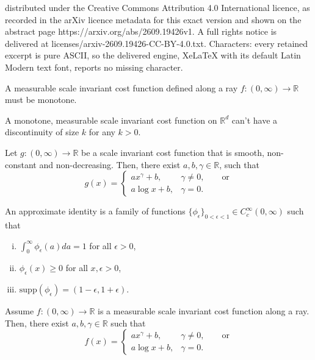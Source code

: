 \documentclass[10pt,a4paper]{amsart}
\newcommand{\R}{\mathbb{R}}
\begin{document}
distributed under the Creative Commons Attribution 4.0 International licence, as recorded in the arXiv licence metadata for this exact version and shown on the abstract page https://arxiv.org/abs/2609.19426v1. A full rights notice is delivered at licenses/arxiv-2609.19426-CC-BY-4.0.txt. Characters: every retained excerpt is pure ASCII, so the delivered engine, XeLaTeX with its default Latin Modern text font, reports no missing character.
\begin{proposition}[monotone]\label{thm:monotone}
  A measurable scale invariant cost function defined along a ray $f:(0,\infty)\rightarrow \mathbb{R}$ must be
  monotone.
\end{proposition}

\begin{proposition}\label{thm:continuous}
  A monotone, measurable scale invariant cost function on
  $\mathbb{R}^d$ can't have a discontinuity of size $k$ for any $k>
  0$.
\end{proposition}

\begin{proposition}\label{scinvfrommin}
  Let $g:(0,\infty)\rightarrow\R$ be a scale invariant cost function that is smooth,
  non-constant and non-decreasing. Then,
   there exist
$a,b,\gamma\in\mathbb{R}$, such that
\begin{equation}\label{eq:cost1dim}
  g(x) =
  \begin{cases}
    ax^\gamma +b, & \gamma\neq 0, \qquad \mbox{or} \\
    a\log x + b, & \gamma=0.
  \end{cases}
\end{equation}
\end{proposition}

\begin{definition}\label{approxid}
  An approximate identity is a family of functions
  $\{\phi_\epsilon\}_{0<\epsilon<1}\in C^\infty_c(0,\infty)$ such that
  \begin{enumerate}[(i)]
  \item $\int_0^\infty \phi_\epsilon(a) da =1$ for all $\epsilon>0$,
  \item $\phi_\epsilon(x)\geq 0$ for all $x,\epsilon>0$,
    \item $\mbox{supp}(\phi_\epsilon) = (1-\epsilon,1+\epsilon)$.
  \end{enumerate}
\end{definition}

\begin{proposition}\label{recoverf}
  Assume $f:(0,\infty)\rightarrow\mathbb{R}$ is a measurable scale
  invariant cost function along a ray. Then, there exist
  $a,b,\gamma\in\mathbb{R}$ such that
  \[
f(x) =
\begin{cases}
  ax^\gamma +b,& \gamma\neq 0, \qquad \mbox{or} \\
  a\log x +b,& \gamma =0.
\end{cases}
\]
\end{proposition}
\end{document}
